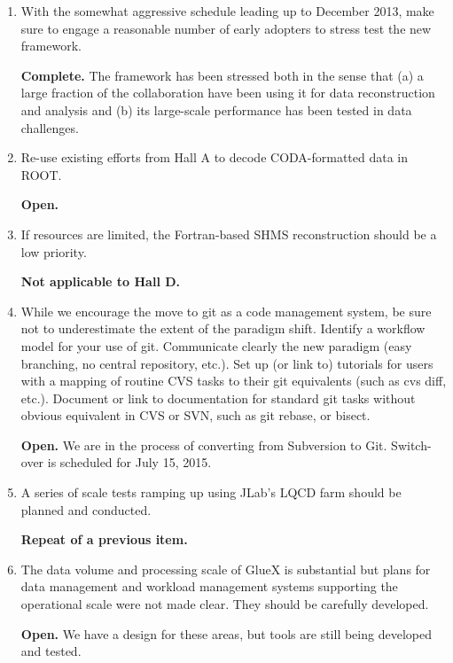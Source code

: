 \documentclass[12pt]{article}
\begin{document}
\begin{enumerate}
  {\bf Not applicable to Hall D.} Our code base is exclusively C++.

\item With the somewhat aggressive schedule leading up to December
  2013, make sure to engage a reasonable number of early adopters to
  stress test the new framework.

  {\bf Complete.} The framework has been stressed both in the sense
  that (a) a large fraction of the collaboration have been using it
  for data reconstruction and analysis and (b) its large-scale
  performance has been tested in data challenges.
  
\item Re-use existing efforts from Hall A to decode CODA-formatted
  data in ROOT.

  {\bf Open.}

\item If resources are limited, the Fortran-based SHMS reconstruction
  should be a low priority.

  {\bf Not applicable to Hall D.}

\item While we encourage the move to git as a code management system,
  be sure not to underestimate the extent of the paradigm
  shift. Identify a workflow model for your use of git. Communicate
  clearly the new paradigm (easy branching, no central repository,
  etc.). Set up (or link to) tutorials for users with a mapping of
  routine CVS tasks to their git equivalents (such as cvs diff,
  etc.). Document or link to documentation for standard git tasks
  without obvious equivalent in CVS or SVN, such as git rebase, or
  bisect.

  {\bf Open.} We are in the process of converting from Subversion to
  Git. Switch-over is scheduled for July 15, 2015.

\item A series of scale tests ramping up using JLab's LQCD farm should
  be planned and conducted.

  {\bf Repeat of a previous item.} 

\item The data volume and processing scale of GlueX is substantial but
  plans for data management and workload management systems supporting
  the operational scale were not made clear. They should be carefully
  developed.

  {\bf Open.} We have a design for these areas, but tools are still
  being developed and tested.


\end{enumerate}
\end{document}
